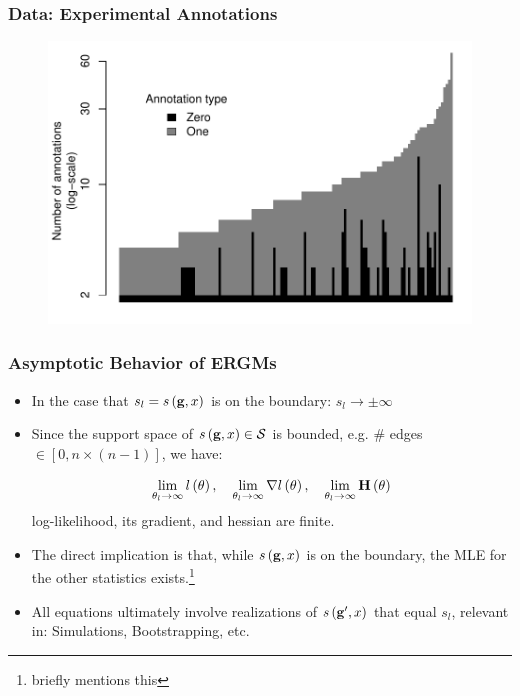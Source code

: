 \documentclass[aspectratio=169, 9pt]{beamer}
\begin{document}
\begin{frame}
	\frametitle{Data: Experimental Annotations}
	\begin{figure}
		\centering
		\includegraphics[width=.7\linewidth]{distribution-annotation-type.pdf}
	\end{figure}
	\vfill\hfill\hyperlink{phylo-table}{}
\end{frame}

\begin{frame}[label=discrete-exponential-theory]
	\frametitle{Asymptotic Behavior of ERGMs}
	
	\begin{itemize}
		\item In the case that $s_l = s\left(\mathbf{g}, x\right)$ is on the boundary: $s_l \to \pm\infty$\pause
		\item Since the support space of $s\left(\mathbf{g}, x\right)\in\mathcal{S}$ is bounded, e.g. \# edges $\in [0,n\times (n - 1)]$, we have: \pause
		
		\begin{equation*}
		\lim_{\theta_l\to\infty}\loglik{\theta}, \quad %
		\lim_{\theta_l\to\infty}\nabla\loglik{\theta}, \quad %
		\lim_{\theta_l\to\infty}\mathbf{H}\left(\theta\right)
		\end{equation*}
		log-likelihood, its gradient, and hessian are finite.\pause
		\item The direct implication is that, while $s\left(\mathbf{g}, x\right)$ is on the boundary, the MLE for the other statistics exists.\footnote{\cite{Handcock2003} briefly mentions this}\pause
		\item All equations ultimately involve realizations of $s\left(\mathbf{g}', x\right)$ that equal $s_l$, relevant in: Simulations, Bootstrapping, etc.
	\end{itemize}
	
	\vfill\hfill\hyperlink{discrete-exponential}{}
	
\end{frame}
\end{document}
